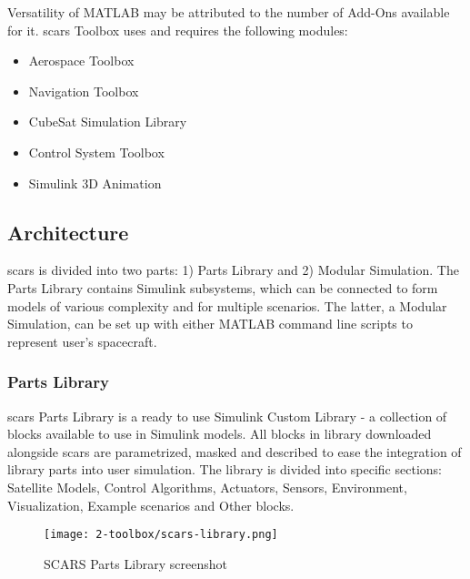     Versatility of MATLAB may be attributed to the number of Add-Ons available for it. \ac{scars} Toolbox uses and requires the following modules:
    \begin{itemize}
        \item Aerospace Toolbox
        \item Navigation Toolbox
        \item CubeSat Simulation Library
        \item Control System Toolbox
        \item Simulink 3D Animation
    \end{itemize}

\subsection{Architecture}\label{toolbox:architecture}
    \ac{scars} is divided into two parts: 1) Parts Library and 2) Modular Simulation. The Parts Library contains Simulink subsystems, which can be connected to form models of various complexity and for multiple scenarios. The latter, a Modular Simulation, can be set up with either MATLAB command line scripts to represent user's spacecraft.

    \subsubsection{Parts Library}
        \ac{scars} Parts Library is a ready to use Simulink Custom Library - a collection of blocks available to use in Simulink models. All blocks in library downloaded alongside \ac{scars} are parametrized, masked and described to ease the integration of library parts into user simulation. The library is divided into specific sections: Satellite Models, Control Algorithms, Actuators, Sensors, Environment, Visualization, Example scenarios and Other blocks.
% 
        \begin{figure}[H]
            \centering
            \texttt{[image: 2-toolbox/scars-library.png]}
            \caption{SCARS Parts Library screenshot}
            \label{fig:scars-library}
        \end{figure}

